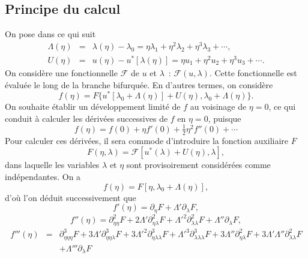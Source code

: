 \documentclass[12pt, final]{amsart}
\begin{document}
\subsection{Principe du calcul}\label{sec20220107121442}

On pose dans ce qui suit
\begin{eqnarray}
  \Lambda (\eta) & = & \lambda (\eta) - \lambda_0 = \eta \lambda_1 + \eta^2
  \lambda_2 + \eta^3 \lambda_3 + \cdots,  \label{eq20211112155446}\\
  U (\eta) & = & u (\eta) - u^{\ast} [\lambda (\eta)] = \eta u_1 + \eta^2 u_2
  + \eta^3 u_3 + \cdots .  \label{eq20211112113028}
\end{eqnarray}
On consid{\`e}re une fonctionnelle $\mathcal{F}$ de $u$ et $\lambda$~:
$\mathcal{F} (u, \lambda)$. Cette fonctionnelle est évaluée le long de
la branche bifurquée. En d'autres termes, on consid{\`e}re
\begin{equation}
  f (\eta) = F \{ u^{\ast} [\lambda_0 + \Lambda (\eta)] + U (\eta), \lambda_0
  + \Lambda (\eta) \} .
\end{equation}
On souhaite établir un développement limité de $f$ au voisinage de
$\eta = 0$, ce qui conduit {\`a} calculer les dérivées successives de
$f$ en $\eta = 0$, puisque
\begin{equation}
  f (\eta) = f (0) + \eta f' (0) + \tfrac{1}{2} \eta^2 f'' (0) + \cdots
\end{equation}
Pour calculer ces dérivées, il sera commode d'introduire la fonction
auxiliaire $F$
\begin{equation}
  F (\eta, \lambda) =\mathcal{F} [u^{\ast} (\lambda) + U (\eta), \lambda],
\end{equation}
dans laquelle les variables $\lambda$ et $\eta$ sont provisoirement
considérées comme indépendantes. On a
\begin{equation}
  f (\eta) = F [\eta, \lambda_0 + \Lambda (\eta)],
\end{equation}
d'o{\`u} l'on déduit successivement que
\begin{equation}
  \label{eq20211112162417} f' (\eta) = \partial_{\eta} F + \Lambda'
  \partial_{\lambda} F,
\end{equation}
\begin{equation}
  \label{eq20211112165810} f'' (\eta) = \partial_{\eta  \eta}^2 F + 2
  \Lambda' \partial_{\eta  \lambda}^2 {F + \Lambda'}^2
  \partial_{\lambda  \lambda}^2 F + \Lambda'' \partial_{\lambda} F,
\end{equation}
\begin{eqnarray}
  \label{eq20211112173223} f''' (\eta) & = & \partial_{\eta  \eta
   \eta}^3 F + 3 \Lambda' \partial_{\eta  \eta
  \lambda}^3 {F + 3 \Lambda'}^2 \partial_{\eta  \lambda
  \lambda}^3 {F + \Lambda'}^3 \partial_{\lambda  \lambda
  \lambda}^3 F + 3 \Lambda'' \partial_{\eta  \lambda}^2 F + 3 \Lambda'
  \Lambda'' \partial_{\lambda  \lambda}^2 F \nonumber\\
  &  &  + \Lambda''' \partial_{\lambda} F
\end{eqnarray}
\end{document}

